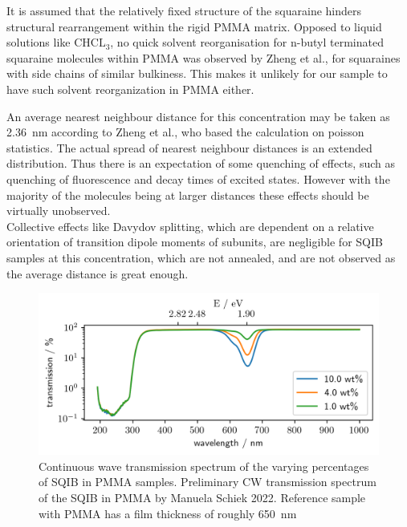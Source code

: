 \documentclass[twoside,openright,listof=numbered]{scrreprt}
\begin{document}
It is assumed that the relatively fixed structure of the squaraine hinders structural rearrangement within the rigid PMMA matrix.
Opposed to liquid solutions like $\mathrm{CHCL_3}$, no quick solvent reorganisation for n-butyl terminated squaraine molecules within PMMA was observed by Zheng et al.\cite{Zheng2020}, for squaraines with side chains of similar bulkiness. This makes it unlikely for our sample to have such solvent reorganization in PMMA either.

An average nearest neighbour distance for this concentration may be taken as \SI{2.36}{\nano\meter} according to Zheng et al.\cite{Zheng2020}, who based the calculation on poisson statistics\cite{Krider2003}. The actual spread of nearest neighbour distances is an extended distribution. Thus there is an expectation of some quenching of effects, such as quenching of fluorescence and decay times of excited states. However with the majority of the molecules being at larger distances these effects should be virtually unobserved.\cite{Zheng2020} \\
Collective effects like Davydov splitting, which are dependent on a relative orientation of transition dipole moments of subunits, are negligible for SQIB samples at this concentration, which are not annealed, and are not observed as the average distance is great enough.\\

\begin{figure}[!htp]
\centering
\includegraphics[scale = 1]{images/SQIB_VarPercentInPMMA_transmission.png}
\caption[Continuous wave transmission spectrum of the varying percentages of SQIB in PMMA samples.]{Continuous wave transmission spectrum of the varying percentages of SQIB in PMMA samples.\label{fig:VarpercentCWspectrum} Preliminary CW transmission spectrum of the SQIB in PMMA by Manuela Schiek 2022.\cite{Schiek2022} Reference sample with PMMA has a film thickness of roughly \SI{650}{\nano\meter}}
\end{figure}
\end{document}
